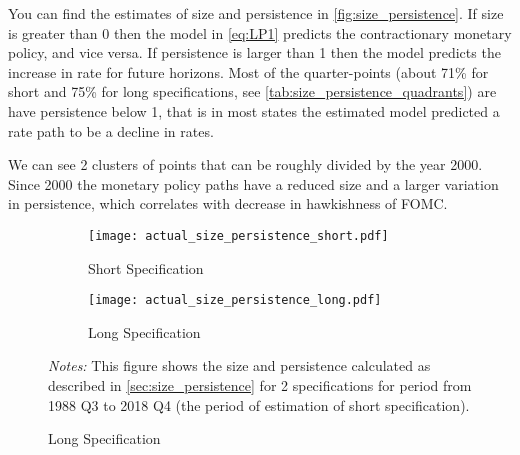 \documentclass[11pt]{article}
\begin{document}
You can find the estimates of size and persistence in \vref{fig:size_persistence}. If size is greater than 0 then the model in \vref{eq:LP1} predicts the contractionary monetary policy, and vice versa. If persistence is larger than 1 then the model predicts the increase in rate for future horizons. Most of the quarter-points (about 71\% for short and 75\% for long specifications, see \vref{tab:size_persistence_quadrants}) are have persistence below 1, that is in most states the estimated model predicted a rate path to be a decline in rates.  


We can see 2 clusters of points that can be roughly divided by the year 2000. 
Since 2000 the monetary policy paths have a reduced size and a larger variation in persistence, which correlates with decrease in hawkishness of FOMC.



\begin{figure}[!hpbt]\centering
  \begin{minipage}{1\textwidth}\centering
    \caption{Historical Estimates of Size and Persistence} 
    \label{fig:size_persistence}
    \vspace{1ex}
    \begin{subfigure}[b]{0.49\textwidth}\centering
      \caption{Short Specification}
      \texttt{[image: actual\_size\_persistence\_short.pdf]}
    \end{subfigure}\hfill
    \begin{subfigure}[b]{0.49\textwidth}\centering
      \caption{Long Specification}
      \texttt{[image: actual\_size\_persistence\_long.pdf]}
    \end{subfigure}
    {\begin{flushleft}\scriptsize \textit{Notes:} This figure shows the size and persistence calculated as described in \vref{sec:size_persistence} for 2 specifications for period from 1988 Q3 to 2018 Q4 (the period of estimation of short specification).\end{flushleft}} 
    \end{minipage}
    
\end{figure}
\end{document}
